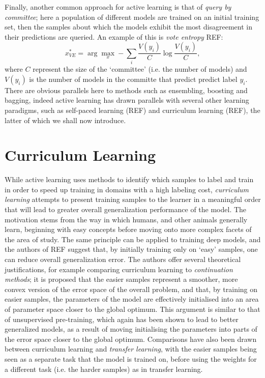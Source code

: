 Finally, another common approach for active learning is that of \textit{query by committee}; here a population of different models are trained on an initial training set, then the samples about which the models exhibit the most disagreement in their predictions are queried. An example of this is \textit{vote entropy} REF:
\begin{equation}
x_{VE}^{*} = \arg\max_{x} - \sum_{i} \frac{V(y_i)}{C} \log \frac{V(y_i)}{C},
\end{equation}
where $C$ represent the size of the `committee' (i.e. the number of models) and $V(y_i)$ is the number of models in the committe that predict predict label $y_i$. There are obvious parallels here to methods such as ensembling, boosting and bagging, indeed active learning has drawn parallels with several other learning paradigms, such as self-paced learning (REF) and curriculum learning (REF), the latter of which we shall now introduce. 

\section{Curriculum Learning}
While active learning uses methods to identify which samples to label and train in order to speed up training in domains with a high labeling cost, \textit{curriculum learning} attempts to present training samples to the learner in a meaningful order that will lead to greater overall generalization performance of the model. The motivation stems from the way in which humans, and other animals generally learn, beginning with easy concepts before moving onto more complex facets of the area of study. The same principle can be applied to training deep models, and the authors of REF suggest that, by initially training only on `easy' samples, one can reduce overall generalization error. The authors offer several theoretical justifications, for example comparing curriculum learning to \textit{continuation methods};  it is proposed that the easier samples represent a smoother, more convex version of the error space of the overall problem, and that, by training on easier samples, the parameters of the model are effectively initialised into an area of parameter space closer to the global optimum. This argument is similar to that of unsupervised pre-training, which again has been shown to lead to better generalized models, as a result of moving initialising the parameters into parts of the error space closer to the global optimum. Comparisons have also been drawn between curriculum learning and \textit{transfer learning}, with the easier samples being seen as a separate task that the model is trained on, before using the weights for a different task (i.e. the harder samples) as in transfer learning.  

